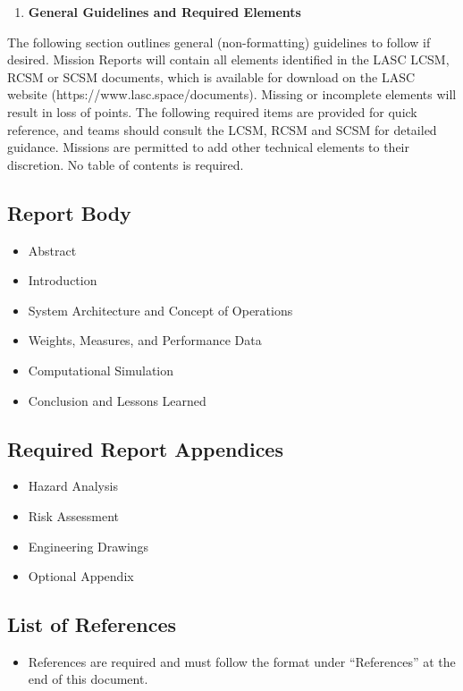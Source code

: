 \begin{enumerate}
\def\labelenumi{\arabic{enumi}.}
\setcounter{enumi}{2}
\item
  \textbf{General Guidelines and Required Elements}
\end{enumerate}

The following section outlines general (non-formatting) guidelines to
follow if desired. Mission Reports will contain all elements identified
in the LASC LCSM, RCSM or SCSM documents, which is available for
download on the LASC website (https://www.lasc.space/documents). Missing
or incomplete elements will result in loss of points. The following
required items are provided for quick reference, and teams should
consult the LCSM, RCSM and SCSM for detailed guidance. Missions are
permitted to add other technical elements to their discretion. No table
of contents is required.

\subsection{Report Body}\label{report-body}

\begin{itemize}
\item
  Abstract
\item
  Introduction
\item
  System Architecture and Concept of Operations
\item
  Weights, Measures, and Performance Data
\item
  Computational Simulation
\item
  Conclusion and Lessons Learned
\end{itemize}

\subsection{Required Report
Appendices}\label{required-report-appendices}

\begin{itemize}
\item
  Hazard Analysis
\item
  Risk Assessment
\item
  Engineering Drawings
\item
  Optional Appendix
\end{itemize}

\subsection{List of References}\label{list-of-references}

\begin{itemize}
\item
  References are required and must follow the format under
  ``References'' at the end of this document.
\end{itemize}
